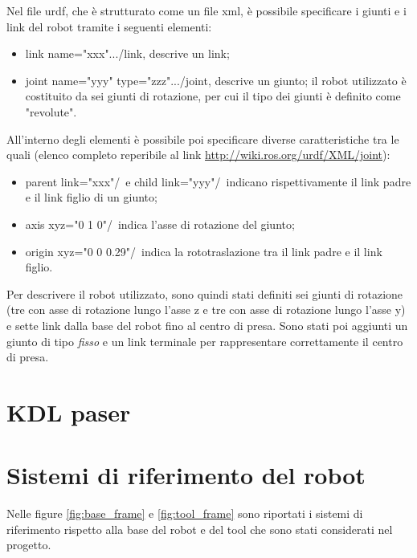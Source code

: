 Nel file urdf, che è strutturato come un file xml, è possibile specificare i giunti e i link del robot tramite i seguenti elementi:
\begin{itemize}
	\item \tl link name="xxx"\tr...\tl /link\tr, descrive un link;
	\item \tl joint name="yyy" type="zzz"\tr...\tl /joint\tr, descrive un giunto; il robot utilizzato è costituito da sei giunti di rotazione, per cui il tipo dei giunti è definito come "revolute".
\end{itemize}
All'interno degli elementi è possibile poi specificare diverse caratteristiche tra le quali (elenco completo reperibile al link \url{http://wiki.ros.org/urdf/XML/joint}):
\begin{itemize}
	\item  \tl parent link="xxx"/\tr\ e \tl child link="yyy"/\tr\ indicano rispettivamente il link padre e il link figlio di un giunto;
	\item \tl axis xyz="0 1 0"/\tr\ indica l'asse di rotazione del giunto;
	\item  \tl origin xyz="0 0 0.29"/\tr\ indica la rototraslazione tra il link padre e il link figlio.
\end{itemize}
Per descrivere il robot utilizzato, sono quindi stati definiti sei giunti di rotazione (tre con asse di rotazione lungo l'asse z e tre con asse di rotazione lungo l'asse y) e sette link dalla base del robot fino al centro di presa. Sono stati poi aggiunti un giunto di tipo \textit{fisso} e un link terminale per rappresentare correttamente il centro di presa.

\clearpage

\section{KDL paser}


\section{Sistemi di riferimento del robot}

Nelle figure \ref{fig:base_frame} e \ref{fig:tool_frame} sono riportati i sistemi di riferimento rispetto alla base del robot e del tool che sono stati considerati nel progetto.

